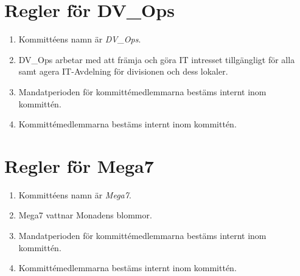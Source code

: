 \documentclass{dvd}
\begin{document}
\section{Regler för DV\_Ops}

\begin{enumerate}[label=\arabic* §, ref=\arabic*]
	\item Kommittéens namn är \emph{DV\_Ops}.

	\item DV\_Ops arbetar med att främja och göra IT intresset tillgängligt för alla samt agera IT-Avdelning för divisionen och dess lokaler.

	\item Mandatperioden för kommittémedlemmarna bestäms internt inom kommittén.

	\item Kommittémedlemmarna bestäms internt inom kommittén.
\end{enumerate}

\section{Regler för Mega7}

\begin{enumerate}[label=\arabic* §, ref=\arabic*]
	\item Kommittéens namn är \emph{Mega7}.

	\item Mega7 vattnar Monadens blommor.

	\item Mandatperioden för kommittémedlemmarna bestäms internt inom kommittén.

	\item Kommittémedlemmarna bestäms internt inom kommittén.
\end{enumerate}
\end{document}
